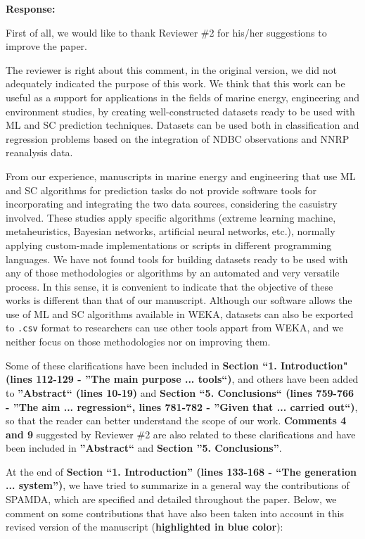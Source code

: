 \documentclass[a4paper,twoside,11pt]{article}
\begin{document}
\textbf{Response:}
{
First of all, we would like to thank Reviewer \#2 for his/her suggestions to improve the paper.

The reviewer is right about this comment, in the original version, we did not adequately indicated the purpose of this work. We think that this work can be useful as a support for applications in the fields of marine energy, engineering and environment studies, by creating well-constructed datasets ready to be used with ML and SC prediction techniques. Datasets can be used both in classification and regression problems based on the integration of NDBC observations and NNRP reanalysis data.

From our experience, manuscripts in marine energy and engineering that use ML and SC algorithms for prediction tasks do not provide software tools for incorporating and integrating the two data sources, considering the casuistry involved. These studies apply specific algorithms (extreme learning machine, metaheuristics, Bayesian networks, artificial neural networks, etc.), normally applying custom-made implementations or scripts in different programming languages. We have not found tools for building datasets ready to be used with any of those methodologies or algorithms by an automated and very versatile process. In this sense, it is convenient to indicate that the objective of these works is different than that of our manuscript. Although our software allows the use of ML and SC algorithms available in WEKA, datasets can also be exported to \texttt{.csv} format to researchers can use other tools appart from WEKA, and we neither focus on those methodologies nor on improving them.

Some of these clarifications have been included in \textbf{Section ``1. Introduction" (lines 112-129 - ''The main purpose ... tools``)}, and others have been added to \textbf{''Abstract`` (lines 10-19)} and \textbf{Section ``5. Conclusions`` (lines 759-766 - ''The aim ... regression``, lines 781-782 - ''Given that ... carried out``)}, so that the reader can better understand the scope of our work. \textbf{Comments 4 and 9} suggested by Reviewer \#2 are also related to these clarifications and have been included in \textbf{''Abstract``} and \textbf{Section ''5. Conclusions''}.

At the end of \textbf{Section ``1. Introduction'' (lines 133-168 - ``The generation ... system'')}, we have tried to summarize in a general way the contributions of SPAMDA, which are specified and detailed throughout the paper. Below, we comment on some contributions that have also been taken into account in this revised version of the manuscript (\textbf{highlighted in blue color}):
\begin{itemize}
	

\end{itemize}}
\end{document}
